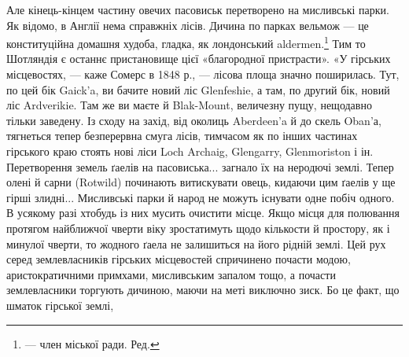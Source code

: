 Але кінець-кінцем частину овечих пасовиськ перетворено
на мисливські парки. Як відомо, в Англії нема справжніх лісів.
Дичина по парках вельмож — це конституційна домашня худоба,
гладка, як лондонський aldermen.\footnote*{
— член міської ради. Ред.
} Тим то Шотляндія є останнє
пристановище цієї «благородної пристрасти». «У гірських місцевостях,
— каже Сомерс в 1848 р., — лісова площа значно
поширилась. Тут, по цей бік Gaick’a, ви бачите новий ліс Glenfeshie,
а там, по другий бік, новий ліс Ardverikie. Там же ви маєте
й Blak-Mount, величезну пущу, нещодавно тільки заведену.
Із сходу на захід, від околиць Aberdeen’a й до скель Oban’а,
тягнеться тепер безперервна смуга лісів, тимчасом як по інших
частинах гірського краю стоять нові ліси Loch Archaig, Glengarry,
Glenmoriston і ін. Перетворення земель ґаелів на пасовиська...
загнало їх на неродючі землі. Тепер олені й сарни (Rotwild)
починають витискувати овець, кидаючи цим ґаелів у ще
гірші злидні... Мисливські парки й народ не можуть існувати
одне побіч одного. В усякому разі хтобудь із них мусить очистити
місце. Якщо місця для полювання протягом найближчої чверти
віку зростатимуть щодо кількости й простору, як і минулої
чверти, то жодного ґаела не залишиться на його рідній землі.
Цей рух серед землевласників гірських місцевостей спричинено
почасти модою, аристократичними примхами, мисливським запалом
тощо, а почасти землевласники торгують дичиною, маючи
на меті виключно зиск. Бо це факт, що шматок гірської землі,
\parbreak{}  %
